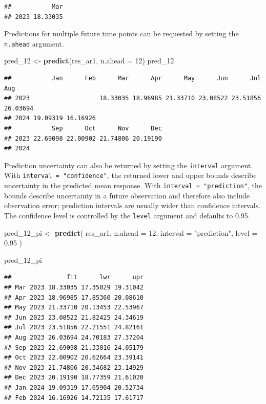 \documentclass[
]{article}
\newenvironment{Shaded}{\begin{snugshade}}{\end{snugshade}}
\newcommand{\AttributeTok}[1]{\textcolor[rgb]{0.13,0.29,0.53}{#1}}
\newcommand{\DecValTok}[1]{\textcolor[rgb]{0.00,0.00,0.81}{#1}}
\newcommand{\FloatTok}[1]{\textcolor[rgb]{0.00,0.00,0.81}{#1}}
\newcommand{\FunctionTok}[1]{\textcolor[rgb]{0.13,0.29,0.53}{\textbf{#1}}}
\newcommand{\NormalTok}[1]{#1}
\newcommand{\OtherTok}[1]{\textcolor[rgb]{0.56,0.35,0.01}{#1}}
\newcommand{\StringTok}[1]{\textcolor[rgb]{0.31,0.60,0.02}{#1}}
\begin{document}
\begin{verbatim}
##           Mar
## 2023 18.33035
\end{verbatim}

Predictions for multiple future time points can be requested by setting
the \texttt{n.ahead} argument.

\begin{Shaded}
\begin{Highlighting}[]
\NormalTok{pred\_12 }\OtherTok{\textless{}{-}} \FunctionTok{predict}\NormalTok{(res\_ar1, }\AttributeTok{n.ahead =} \DecValTok{12}\NormalTok{)}
\NormalTok{pred\_12}
\end{Highlighting}
\end{Shaded}

\begin{verbatim}
##           Jan      Feb      Mar      Apr      May      Jun      Jul      Aug
## 2023                   18.33035 18.96985 21.33710 23.08522 23.51856 26.03694
## 2024 19.09319 16.16926                                                      
##           Sep      Oct      Nov      Dec
## 2023 22.69098 22.00902 21.74806 20.19190
## 2024
\end{verbatim}

Prediction uncertainty can also be returned by setting the
\texttt{interval} argument. With \texttt{interval\ =\ "confidence"}, the
returned lower and upper bounds describe uncertainty in the predicted
mean response. With \texttt{interval\ =\ "prediction"}, the bounds
describe uncertainty in a future observation and therefore also include
observation error; prediction intervals are usually wider than
confidence intervals. The confidence level is controlled by the
\texttt{level} argument and defaults to 0.95.

\begin{Shaded}
\begin{Highlighting}[]
\NormalTok{pred\_12\_pi }\OtherTok{\textless{}{-}} \FunctionTok{predict}\NormalTok{(}
\NormalTok{  res\_ar1,}
  \AttributeTok{n.ahead =} \DecValTok{12}\NormalTok{,}
  \AttributeTok{interval =} \StringTok{"prediction"}\NormalTok{,}
  \AttributeTok{level =} \FloatTok{0.95}
\NormalTok{)}

\NormalTok{pred\_12\_pi}
\end{Highlighting}
\end{Shaded}

\begin{verbatim}
##               fit      lwr      upr
## Mar 2023 18.33035 17.35029 19.31042
## Apr 2023 18.96985 17.85360 20.08610
## May 2023 21.33710 20.13453 22.53967
## Jun 2023 23.08522 21.82425 24.34619
## Jul 2023 23.51856 22.21551 24.82161
## Aug 2023 26.03694 24.70183 27.37204
## Sep 2023 22.69098 21.33016 24.05179
## Oct 2023 22.00902 20.62664 23.39141
## Nov 2023 21.74806 20.34682 23.14929
## Dec 2023 20.19190 18.77359 21.61020
## Jan 2024 19.09319 17.65904 20.52734
## Feb 2024 16.16926 14.72135 17.61717
\end{verbatim}
\end{document}
